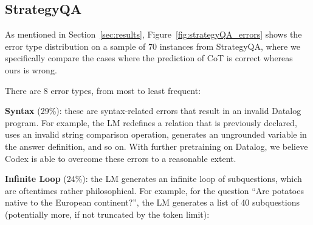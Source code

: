 \documentclass[11pt]{article}
\begin{document}
\subsection{StrategyQA}
\label{sec:appendix_strategyQA_error_analysis}

As mentioned in Section~\ref{sec:results}, Figure~\ref{fig:strategyQA_errors} shows the error type distribution on a sample of 70 instances from StrategyQA, where we specifically compare the cases where the prediction of CoT is correct whereas ours is wrong. 



There are 8 error types, from most to least frequent:

\textbf{Syntax} (29\%): these are syntax-related errors that result in an invalid Datalog program. For example, the LM redefines a relation that is previously declared, uses an invalid string comparison operation, generates an ungrounded variable in the answer definition, and so on. With further pretraining on Datalog, we believe Codex is able to overcome these errors to a reasonable extent.

\textbf{Infinite Loop} (24\%): the LM generates an infinite loop of subquestions, which are oftentimes rather philosophical. For example, for the question ``Are potatoes native to the European continent?'', the LM generates a list of 40 subquestions (potentially more, if not truncated by the token limit):
\end{document}
